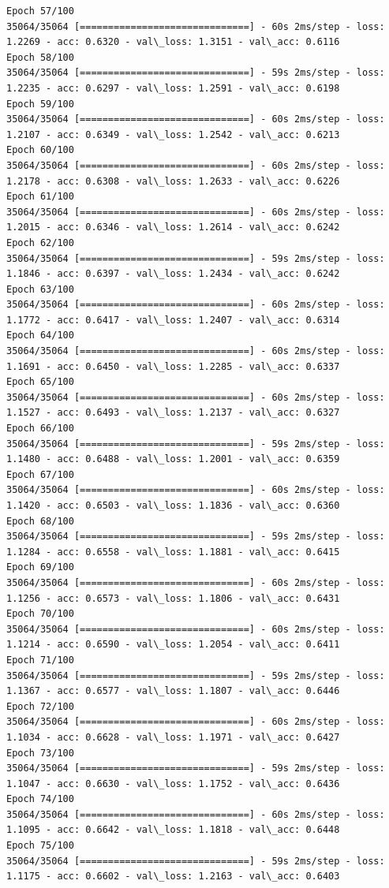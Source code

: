 \documentclass[11pt]{article}
\begin{document}
\begin{Verbatim}[commandchars=\\\{\}]
Epoch 57/100
35064/35064 [==============================] - 60s 2ms/step - loss: 1.2269 - acc: 0.6320 - val\_loss: 1.3151 - val\_acc: 0.6116
Epoch 58/100
35064/35064 [==============================] - 59s 2ms/step - loss: 1.2235 - acc: 0.6297 - val\_loss: 1.2591 - val\_acc: 0.6198
Epoch 59/100
35064/35064 [==============================] - 60s 2ms/step - loss: 1.2107 - acc: 0.6349 - val\_loss: 1.2542 - val\_acc: 0.6213
Epoch 60/100
35064/35064 [==============================] - 60s 2ms/step - loss: 1.2178 - acc: 0.6308 - val\_loss: 1.2633 - val\_acc: 0.6226
Epoch 61/100
35064/35064 [==============================] - 60s 2ms/step - loss: 1.2015 - acc: 0.6346 - val\_loss: 1.2614 - val\_acc: 0.6242
Epoch 62/100
35064/35064 [==============================] - 59s 2ms/step - loss: 1.1846 - acc: 0.6397 - val\_loss: 1.2434 - val\_acc: 0.6242
Epoch 63/100
35064/35064 [==============================] - 60s 2ms/step - loss: 1.1772 - acc: 0.6417 - val\_loss: 1.2407 - val\_acc: 0.6314
Epoch 64/100
35064/35064 [==============================] - 60s 2ms/step - loss: 1.1691 - acc: 0.6450 - val\_loss: 1.2285 - val\_acc: 0.6337
Epoch 65/100
35064/35064 [==============================] - 60s 2ms/step - loss: 1.1527 - acc: 0.6493 - val\_loss: 1.2137 - val\_acc: 0.6327
Epoch 66/100
35064/35064 [==============================] - 59s 2ms/step - loss: 1.1480 - acc: 0.6488 - val\_loss: 1.2001 - val\_acc: 0.6359
Epoch 67/100
35064/35064 [==============================] - 60s 2ms/step - loss: 1.1420 - acc: 0.6503 - val\_loss: 1.1836 - val\_acc: 0.6360
Epoch 68/100
35064/35064 [==============================] - 59s 2ms/step - loss: 1.1284 - acc: 0.6558 - val\_loss: 1.1881 - val\_acc: 0.6415
Epoch 69/100
35064/35064 [==============================] - 60s 2ms/step - loss: 1.1256 - acc: 0.6573 - val\_loss: 1.1806 - val\_acc: 0.6431
Epoch 70/100
35064/35064 [==============================] - 60s 2ms/step - loss: 1.1214 - acc: 0.6590 - val\_loss: 1.2054 - val\_acc: 0.6411
Epoch 71/100
35064/35064 [==============================] - 59s 2ms/step - loss: 1.1367 - acc: 0.6577 - val\_loss: 1.1807 - val\_acc: 0.6446
Epoch 72/100
35064/35064 [==============================] - 60s 2ms/step - loss: 1.1034 - acc: 0.6628 - val\_loss: 1.1971 - val\_acc: 0.6427
Epoch 73/100
35064/35064 [==============================] - 59s 2ms/step - loss: 1.1047 - acc: 0.6630 - val\_loss: 1.1752 - val\_acc: 0.6436
Epoch 74/100
35064/35064 [==============================] - 60s 2ms/step - loss: 1.1095 - acc: 0.6642 - val\_loss: 1.1818 - val\_acc: 0.6448
Epoch 75/100
35064/35064 [==============================] - 59s 2ms/step - loss: 1.1175 - acc: 0.6602 - val\_loss: 1.2163 - val\_acc: 0.6403

\end{Verbatim}
\end{document}
